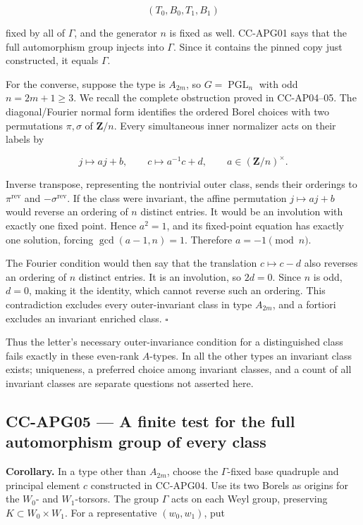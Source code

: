 \documentclass[11pt,a4paper]{article}
\theoremstyle{definition}\newtheorem{definition}[theorem]{Definition}
\theoremstyle{remark}\newtheorem{remark}[theorem]{Remark}
\begin{document}
\[
 (T_0,B_0,T_1,B_1)
\]

fixed by all of \(\Gamma\), and the generator \(n\) is fixed as well.
CC-APG01 says that the full automorphism group injects into \(\Gamma\).
Since it contains the pinned copy just constructed, it equals
\(\Gamma\).

For the converse, suppose the type is \(A_{2m}\), so
\(G=\operatorname{PGL}_n\) with odd \(n=2m+1\geq3\). We recall the
complete obstruction proved in CC-AP04--05. The diagonal/Fourier normal
form identifies the ordered Borel choices with two permutations
\(\pi,\sigma\) of \(\mathbf Z/n\). Every simultaneous inner normalizer
acts on their labels by

\[
 j\longmapsto aj+b,\qquad
 c\longmapsto a^{-1}c+d,\qquad a\in(\mathbf Z/n)^\times.
\]

Inverse transpose, representing the nontrivial outer class, sends their
orderings to \(\pi^{\mathrm{rev}}\) and \(-\sigma^{\mathrm{rev}}\). If
the class were invariant, the affine permutation \(j\mapsto aj+b\) would
reverse an ordering of \(n\) distinct entries. It would be an involution
with exactly one fixed point. Hence \(a^2=1\), and its fixed-point
equation has exactly one solution, forcing \(\gcd(a-1,n)=1\). Therefore
\(a=-1\pmod n\).

The Fourier condition would then say that the translation
\(c\mapsto c-d\) also reverses an ordering of \(n\) distinct entries. It
is an involution, so \(2d=0\). Since \(n\) is odd, \(d=0\), making it
the identity, which cannot reverse such an ordering. This contradiction
excludes every outer-invariant class in type \(A_{2m}\), and a fortiori
excludes an invariant enriched class. \(\square\)

Thus the letter's necessary outer-invariance condition for a
distinguished class fails exactly in these even-rank \(A\)-types. In all
the other types an invariant class exists; uniqueness, a preferred
choice among invariant classes, and a count of all invariant classes are
separate questions not asserted here.

\subsection{CC-APG05 --- A finite test for the full automorphism group
of every
class}\label{cc-apg05-a-finite-test-for-the-full-automorphism-group-of-every-class}

\textbf{Corollary.} In a type other than \(A_{2m}\), choose the
\(\Gamma\)-fixed base quadruple and principal element \(c\) constructed
in CC-APG04. Use its two Borels as origins for the \(W_0\)- and
\(W_1\)-torsors. The group \(\Gamma\) acts on each Weyl group,
preserving \(K\subset W_0\times W_1\). For a representative
\((w_0,w_1)\), put
\end{document}
